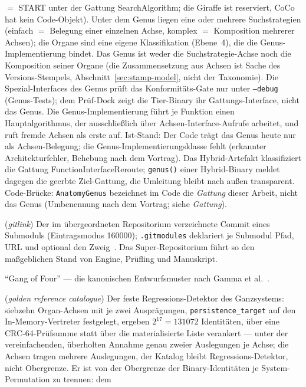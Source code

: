 \begin{description}
  $=$ START unter der Gattung SearchAlgorithm; die Giraffe ist reserviert, CoCo hat kein Code-Objekt).
  Unter dem Genus liegen eine oder mehrere Suchstrategien (einfach $=$ Belegung einer einzelnen Achse,
  komplex $=$ Komposition mehrerer Achsen); die Organe sind eine eigene Klassifikation (Ebene~4), die
  die Genus-Implementierung bindet. Das Genus ist weder die Suchstrategie-Achse noch die Komposition
  seiner Organe (die Zusammensetzung aus Achsen ist Sache des Versions-Stempels,
  Abschnitt~\ref{sec:stamp-model}, nicht der Taxonomie). Die Spezial-Interfaces des Genus prüft das
  Konformitäts-Gate nur unter \texttt{--debug} (Genus-Tests); dem Prüf-Dock zeigt die Tier-Binary ihr
  Gattungs-Interface, nicht das Genus. Die Genus-Implementierung führt je Funktion einen Hauptalgorithmus,
  der ausschließlich über Achsen-Interface-Aufrufe arbeitet, und ruft fremde Achsen als erste auf. Ist-Stand:
  Der Code trägt das Genus heute nur als Achsen-Belegung; die Genus-Implementierungsklasse fehlt
  (erkannter Architekturfehler, Behebung nach dem Vortrag). Das Hybrid-Artefakt klassifiziert die
  Gattung FunctionInterfaceReroute; \texttt{genus()} einer Hybrid-Binary meldet dagegen die geerbte
  Ziel-Gattung, die Umleitung bleibt nach außen transparent. Code-Brücke: \texttt{AnatomyGenus}
  bezeichnet im Code die \emph{Gattung} dieser Arbeit, nicht das Genus (Umbenennung nach dem Vortrag;
  siehe \emph{Gattung}).
  \item[Gitlink] (\emph{gitlink}) Der im übergeordneten Repositorium verzeichnete Commit eines
  Submoduls (Eintragsmodus 160000); \texttt{.gitmodules} deklariert je Submodul Pfad, URL und
  optional den Zweig~\cite{git2026gitmodules}. Das Super-Repositorium führt so den maßgeblichen
  Stand von Engine, Prüfling und Manuskript.
  \item[GoF] \enquote{Gang of Four} --- die kanonischen Entwurfsmuster nach Gamma et
  al.~\cite{gamma1994patterns}.
  \item[golden-Referenzkatalog] (\emph{golden reference catalogue}) Der feste Regressions-Detektor
  des Ganzsystems: siebzehn Organ-Achsen mit je zwei Ausprägungen, \texttt{persistence\_target} auf
  den In-Memory-Vertreter festgelegt, ergeben $2^{17} = 131072$ Identitäten, über eine CRC-64-Prüfsumme
  statt über die materialisierte Liste verankert --- unter der vereinfachenden, überholten Annahme genau
  zweier Auslegungen je Achse; die Achsen tragen mehrere Auslegungen, der Katalog bleibt Regressions-Detektor,
  nicht Obergrenze. Er ist von der Obergrenze der Binary-Identitäten je System-Permutation zu trennen: dem

\end{description}
